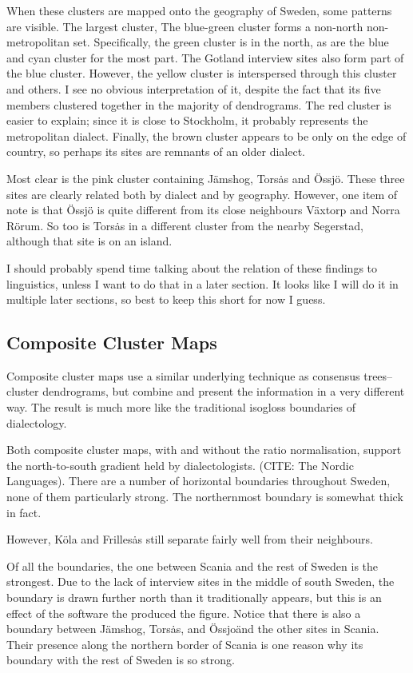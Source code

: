 When these clusters are mapped onto the geography of Sweden, some
patterns are visible. The largest cluster, The blue-green cluster
forms a non-north non-metropolitan set. Specifically, the green
cluster is in the north, as are the blue and cyan cluster for the most
part. The Gotland interview sites also form part of the blue
cluster. However, the yellow cluster is interspersed through this
cluster and others. I see no obvious interpretation of it, despite the
fact that its five members clustered together in the majority of
dendrograms. The red cluster is easier to explain; since it is close
to Stockholm, it probably represents the metropolitan
dialect. Finally, the brown cluster appears to be only on the edge of
country, so perhaps its sites are remnants of an older dialect.

Most clear is the pink cluster containing J\"amshog, Tors\.as and
\"Ossj\"o. These three sites are clearly related both by dialect and
by geography. However, one item of note is that \"Ossj\"o is quite
different from its close neighbours V\"axtorp and Norra R\"orum. So
too is Tors\.as in a different cluster from the nearby Segerstad,
although that site is on an island.

I should probably spend time talking about the relation of these
findings to linguistics, unless I want to do that in a later
section. It looks like I will do it in multiple later sections, so
best to keep this short for now I guess.

\subsection{Composite Cluster Maps}

Composite cluster maps use a similar underlying technique as consensus
trees--cluster dendrograms, but combine and present the information in
a very different way. The result is much more like the traditional
isogloss boundaries of dialectology.

Both composite cluster maps, with and without the ratio normalisation,
support the north-to-south gradient held by dialectologists. (CITE:
The Nordic Languages). There are a number of horizontal boundaries
throughout Sweden, none of them particularly strong. The northernmost
boundary is somewhat thick in fact.

However, K\"ola and Frilles\.as still separate fairly well from their
neighbours.

Of all the boundaries, the one between Scania and the rest of Sweden
is the strongest. Due to the lack of interview sites in the middle of
south Sweden, the boundary is drawn further north than it
traditionally appears, but this is an effect of the software the
produced the figure. Notice that there is also a boundary between
J\"amshog, Tors\.as, and \"Ossjo\" and the other sites in
Scania. Their presence along the northern border of Scania is one
reason why its boundary with the rest of Sweden is so strong.

